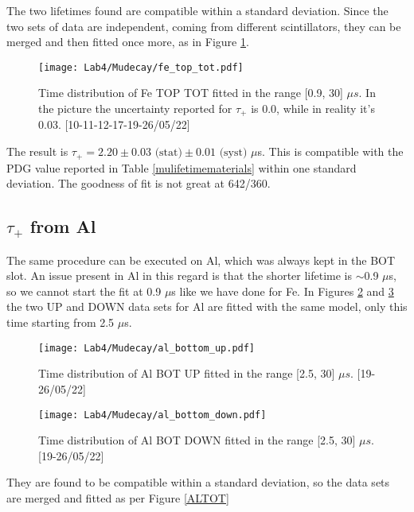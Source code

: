 \documentclass[10pt,a4paper,twocolumn]{article}
\begin{document}
The two lifetimes found are compatible within a standard deviation. Since the two sets of data are independent, coming from different scintillators, they can be merged and then fitted once more, as in Figure \ref{FETOT}.

\begin{figure}[h!]
\centering
\caption{Time distribution of Fe TOP TOT fitted in the range [0.9, 30] $\mu s$. In the picture the uncertainty reported for $\tau_+$ is 0.0, while in reality it's 0.03. [10-11-12-17-19-26/05/22]}
\texttt{[image: Lab4/Mudecay/fe\_top\_tot.pdf]} 
\label{FETOT}
\end{figure}

The result is $\tau_+=2.20 \pm 0.03 \text{ (stat)}  \pm 0.01 \text{ (syst) }\mu$s. This is compatible with the PDG value reported in Table \ref{mulifetimematerials} within one standard deviation. The goodness of fit is not great at 642/360.









\subsection{$\tau_+$ from Al}

The same procedure can be executed on Al, which was always kept in the BOT slot. An issue present in Al in this regard is that the shorter lifetime is $\sim$0.9 $\mu$s, so we cannot start the fit at 0.9 $\mu$s like we have done for Fe. In Figures \ref{ALUP} and \ref{ALDWN} the two UP and DOWN data sets for Al are fitted with the same model, only this time starting from 2.5 $\mu$s.


\begin{figure}[h!]
\centering
\caption{Time distribution of Al BOT UP fitted in the range [2.5, 30] $\mu s$. [19-26/05/22]}
\texttt{[image: Lab4/Mudecay/al\_bottom\_up.pdf]} 
\label{ALUP}
\end{figure}

\begin{figure}[h!]
\centering
\caption{Time distribution of Al BOT DOWN fitted in the range [2.5, 30] $\mu s$. [19-26/05/22]}
\texttt{[image: Lab4/Mudecay/al\_bottom\_down.pdf]} 
\label{ALDWN}
\end{figure}


They are found to be compatible within a standard deviation, so the data sets are merged and fitted as per Figure \ref{ALTOT}
\end{document}
